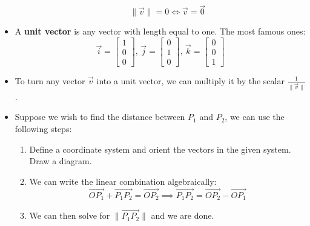 \begin{itemize}
\begin{itemize}
        \begin{equation}
            \lVert \vec{v} \rVert = 0 \iff \vec{v}=\vec{0}
            \label{eq:}
        \end{equation}
    \end{itemize}
\item A \textbf{unit vector} is any vector with length equal to one. The most famous ones:
    \begin{equation}
        \vec{i}= \begin{bmatrix}
            1\\0\\0
        \end{bmatrix} ,\,
        \vec{j}=\begin{bmatrix}
            0\\1\\0
        \end{bmatrix},\,
        \vec{k}=\begin{bmatrix}
            0\\0\\1
        \end{bmatrix}
    \end{equation}
    \item To turn any vector $\vec{v}$ into a unit vector, we can multiply it by the scalar $\frac{1}{\lVert \vec{v} \rVert}$.
    \item Suppose we wish to find the distance between $P_1$ and $P_2$, we can use the following steps:
    \begin{enumerate}
        \item Define a coordinate system and orient the vectors in the given system. Draw a diagram.
        \item We can write the linear combination algebraically:
        \begin{equation}
            \overrightarrow{OP_1}+\overrightarrow{P_1P_2} = \overrightarrow{OP_2} \implies \overrightarrow{P_1P_2}=\overrightarrow{OP_2}-\overrightarrow{OP_1}
            \label{eq:}
        \end{equation}
        \item We can then solve for $\lVert\overrightarrow{P_1P_2}\rVert$ and we are done.
    \end{enumerate}
\end{itemize}